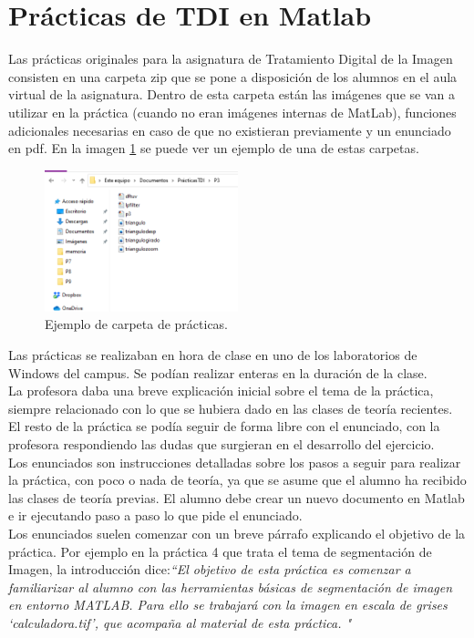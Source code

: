 \section{Prácticas de TDI en Matlab}


Las prácticas originales para la asignatura de Tratamiento Digital de la Imagen consisten en una carpeta zip que se pone a disposición de los alumnos en el aula virtual de la asignatura. Dentro de esta carpeta están las imágenes que se van a utilizar en la práctica (cuando no eran imágenes internas de MatLab), funciones adicionales necesarias en caso de que no existieran previamente y un enunciado en pdf. En la imagen \ref{carpetapracticas} se puede ver un ejemplo de una de estas carpetas.
 
\begin{figure}[h]
\centering
\includegraphics[width=0.5\textwidth]{imagenes/carpetapracticas}
\caption{Ejemplo de carpeta de prácticas.}
\label{carpetapracticas}
\end{figure}

Las prácticas se realizaban en hora de clase en uno de los laboratorios de Windows del campus. Se podían realizar enteras en la duración de la clase. \\

La profesora daba una breve explicación inicial sobre el tema de la práctica, siempre relacionado con lo que se hubiera dado en las clases de teoría recientes. El resto de la práctica se podía seguir de forma libre con el enunciado, con la profesora respondiendo las dudas que surgieran en el desarrollo del ejercicio. \\

Los enunciados son instrucciones detalladas sobre los pasos a seguir para realizar la práctica, con poco o nada de teoría, ya que se asume que el alumno ha recibido las clases de teoría previas. El alumno debe crear un nuevo documento en Matlab e ir ejecutando paso a paso lo que pide el enunciado. \\

Los enunciados suelen comenzar con un breve párrafo explicando el objetivo de la práctica. Por ejemplo en la práctica 4 que trata el tema de segmentación de Imagen, la introducción dice:\emph{``El objetivo de esta práctica es comenzar a familiarizar al alumno con las herramientas básicas de segmentación de imagen en entorno MATLAB. Para ello se trabajará con la imagen en escala de
grises ‘calculadora.tif’, que acompaña al material de esta práctica. "}\\

